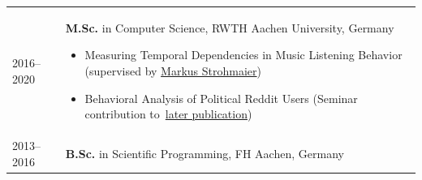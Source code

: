 \begin{longtable}[l]{@{}p{} p{}}
    2016--2020 & \textbf{M.Sc.} in Computer Science, RWTH Aachen University, Germany
               \begin{itemize}
                   \item \raggedright Measuring Temporal Dependencies in Music Listening Behavior (supervised by \href{https://www.bwl.uni-mannheim.de/en/information-systems/chairs/prof-dr-strohmaier/}{Markus Strohmaier})
                   \item \raggedright Behavioral Analysis of Political Reddit Users (Seminar contribution to~\href{https://dl.acm.org/doi/abs/10.1145/3342220.3343662}{later publication})
               \end{itemize}\\

    2013--2016 & \textbf{B.Sc.} in Scientific Programming, FH Aachen, Germany\\



\end{longtable}
